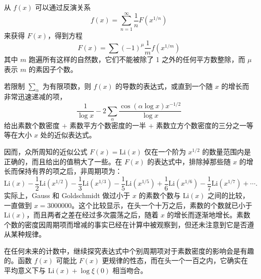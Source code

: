 从 $f(x)$ 可以通过反演关系
\[
f(x) = \sum_{n=1}^{\infty} \frac{1}{n} F\left(x^{1/n}\right)
\]
来获得 $F(x)$，得到方程
\[
F(x) = \sum (-1)^{\mu} \frac{1}{m} f\left(x^{1/m}\right)
\]
其中 $m$ 跑遍所有这样的自然数，它们不能被除了 1 之外的任何平方数整除，而 $\mu$ 表示 $m$ 的素因子个数。

若限制 $\sum_{\alpha}$ 为有限项数，则 $f(x)$ 的导数的表达式，或直到一个随 $x$ 的增长而非常迅速递减的项，
\[
\frac{1}{\log x} - 2\sum_{\alpha} \frac{\cos(\alpha \log x) x^{-1/2}}{\log x}
\]
给出素数个数密度 $+$ 素数平方个数密度的一半 $+$ 素数立方个数密度的三分之一等等在大小 $x$ 处的近似表达式。

因而，众所周知的近似公式 $F(x) = \text{Li}(x)$ 仅在一个阶为 $x^{1/2}$ 的数量范围内是正确的，而且给出的值稍大了一些。在 $F(x)$ 的表达式中，排除掉那些随 $x$ 的增长而保持有界的项之后，非周期项为：
\[
\text{Li}(x) - \frac{1}{2}\text{Li}(x^{1/2}) - \frac{1}{3}\text{Li}(x^{1/3}) - \frac{1}{5}\text{Li}(x^{1/5}) + \frac{1}{6}\text{Li}(x^{1/6}) - \frac{1}{7}\text{Li}(x^{1/7}) + \cdots.
\]
实际上，Gauss 和 Goldschmidt 做过小于 $x$ 的素数个数与 $\text{Li}(x)$ 之间的比较，一直做到 $x = 3000000$。这个比较显示，在头一个十万之后，素数的个数就已小于 $\text{Li}(x)$，而且两者之差在经过多次震荡之后，随着 $x$ 的增长而逐渐地增长。素数个数的密度因周期项而增减的事实已经在计算中被观察到，但还未注意到它是否遵从某种规律。

在任何未来的计数中，继续探究表达式中个别周期项对于素数密度的影响会是有趣的。函数 $f(x)$ 可能比 $F(x)$ 更规律的性态，而在头一个一百之内，它确实在平均意义下与 $\text{Li}(x) + \log\xi(0)$ 相当吻合。

